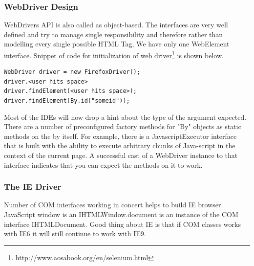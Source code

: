 \documentclass[article,type=msc,colorback,accentcolor=tud9c,twoside,11pt]{tudthesis}
\begin{document}
\subsubsection{WebDriver Design}
WebDrivers API \cite{SeleniumTestingFramework} is also called as  object-based. The interfaces are very well defined and try to manage single responsibility and therefore rather than modelling every single possible HTML Tag, We have only one WebElement interface. Snippet of code for initialization of web driver\footnote{http://www.aosabook.org/en/selenium.html} is shown below.
\begin{lstlisting}
WebDriver driver = new FirefoxDriver();
driver.<user hits space>
driver.findElement(<user hits space>);
driver.findElement(By.id("someid"));
\end{lstlisting}
Most of the IDEs will now drop a hint about the type of the argument expected. There are a number of preconfigured factory methods for "By" objects as static methods on the by itself. For example, there is a JavascriptExecutor interface that is built with the ability to execute arbitrary chunks of Java-script in the context of the current page. A successful cast of a WebDriver instance to that interface indicates that you can expect the methods on it to work.
\subsubsection{The IE Driver}
Number of COM interfaces working in concert helps to build IE browser. JavaScript window is an IHTMLWindow.document is an instance of the COM interface IHTMLDocument. Good thing about IE is that if COM classes works with IE6 it will still continue to work with IE9.
\end{document}
